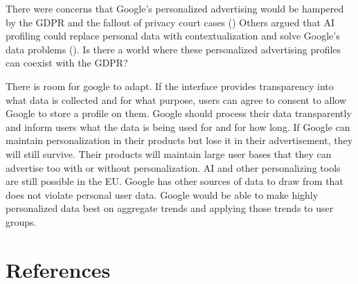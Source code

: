 \documentclass[
	letterpaper, %
]{jdf}
\begin{document}
There were concerns that Google's personalized advertising would be hampered by the GDPR and the fallout of privacy court cases (\cite{barry_gdpr_2019}) Others argued that AI profiling could replace personal data with contextualization and solve Google's data problems (\cite{davies_personalization_2018}). Is there a world where these personalized advertising profiles can coexist with the GDPR?  

There is room for google to adapt. If the interface provides transparency into what data is collected and for what purpose, users can agree to consent to allow Google to store a profile on them. Google should process their data transparently and inform users what the data is being used for and for how long. If Google can maintain personalization in their products but lose it in their advertisement, they will still survive. Their products will maintain large user bases that they can advertise too with or without personalization. AI and other personalizing tools are still possible in the EU. Google has other sources of data to draw from that does not violate personal user data. Google would be able to make highly personalized data best on aggregate trends and applying those trends to user groups. 

\section{References}
\printbibliography[heading=none]
\end{document}
